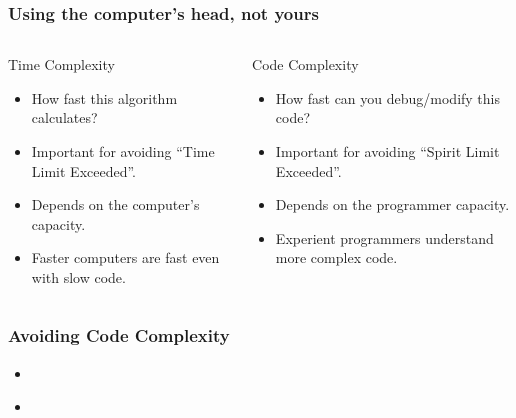 \begin{frame}
  \frametitle{Using the computer's head, not yours}
  {\small
  \begin{columns}[c]
    \begin{block}{Time Complexity}
      \begin{itemize}
      \item How fast this algorithm calculates? 
      \item Important for avoiding ``Time Limit Exceeded''. 
      \item Depends on the computer's capacity. 
      \item Faster computers are fast even with slow code.
      \end{itemize}
    \end{block}
    \begin{block}{Code Complexity}
      \begin{itemize}
      \item How fast can you debug/modify this code?
      \item Important for avoiding ``Spirit Limit Exceeded''. 
      \item Depends on the programmer capacity. 
      \item Experient programmers understand more complex code.
      \end{itemize}
    \end{block}
  \end{columns}
    }
\end{frame}

\begin{frame}
  \frametitle{Avoiding Code Complexity}

  \begin{itemize}
    \item {}\\ 
    \item {}\\ 
  \end{itemize}

\end{frame}

